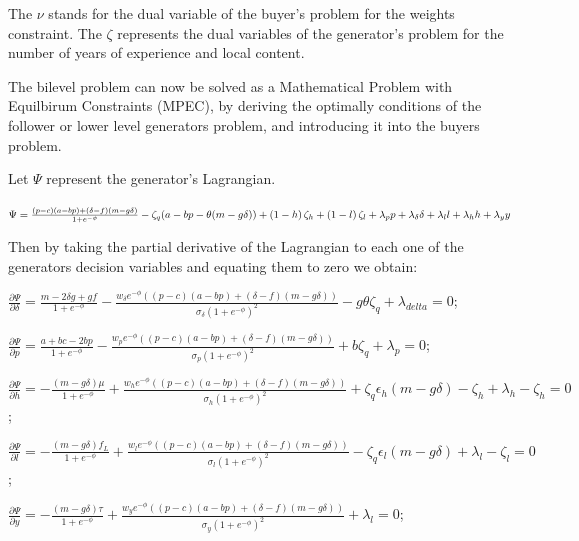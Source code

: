 \documentclass[informs]{informs3}
\begin{document}
The $\nu$ stands for the dual variable of the buyer's problem for the weights constraint. The $\zeta$ represents the dual variables of the generator's problem for the number of years of experience and local content. 

The bilevel problem can now be solved as a Mathematical Problem with  Equilbirum Constraints (MPEC), by deriving the optimally conditions of the follower or lower level generators problem, and introducing it into the buyers problem.

Let $\Psi$ represent the generator's Lagrangian.  

$\Psi =\frac{\left(p-c\right)(a - bp )+\left(\delta-f\right)(m -g\delta)}{1+e^{-\phi}} - \zeta_q(a - bp -\theta (m -g\delta))+\left( 1-h\right)\zeta_h+\left( 1-l\right)\zeta_l \\ +\lambda_p p+\lambda_{\delta} \delta+\lambda_l l +\lambda_h h+\lambda_y y  $

Then by taking the partial derivative of the Lagrangian to each one of the generators decision variables and equating them to zero we obtain:

$\frac{\partial \Psi}{\partial \delta} = \frac{m-2\delta g + g f}{1+e^{-\phi}}-\frac{w_{\delta} e^{-\phi} \left(\left(p-c\right)(a - bp )  +\left(\delta-f\right)(m -g\delta)\right)}{\sigma_{\delta}(1+e^{-\phi})^{2}}-g \theta \zeta_q + \lambda_{delta} =0 $;

$\frac{\partial \Psi}{\partial p} = \frac{a+bc-2bp}{1+e^{-\phi}}-\frac{w_p e^{-\phi} \left(\left(p-c\right)(a - bp )  +\left(\delta-f\right)(m -g\delta)\right)}{\sigma_{p}(1+e^{-\phi})^{2}}+b \zeta_q + \lambda_{p}  =0 $;

$\frac{\partial \Psi}{\partial h} = -\frac{\left(m-g\delta\right)\mu}{1+e^{-\phi}}+{\frac{w_h e^{-\phi} \left(\left(p-c\right)(a - bp )  +\left(\delta-f\right)(m -g\delta)\right)}{\sigma_{h}(1+e^{-\phi})^{2}}}+\zeta_q \epsilon_h \left( m-g\delta\right)-\zeta_h+ \lambda_{h}-\zeta_h  =0 $;

$\frac{\partial \Psi}{\partial l} =  -\frac{\left(m-g\delta\right)f_{L}}{1+e^{-\phi}}+{\frac{w_l e^{-\phi} \left(\left(p-c\right)(a - bp )  +\left(\delta-f\right)(m -g\delta)\right)}{\sigma_{l}(1+e^{-\phi})^{2}}}-\zeta_q \epsilon_l \left( m-g\delta\right)+ \lambda_{l}  -\zeta_l=0 $;

$\frac{\partial \Psi}{\partial y} = -\frac{\left(m-g\delta\right)\tau}{1+e^{-\phi}}+ {\frac{w_y e^{-\phi} \left(\left(p-c\right)(a - bp )  +\left(\delta-f\right)(m -g\delta)\right)}{\sigma_{y}(1+e^{-\phi})^{2}}}+\lambda_{l}  =0 $;
\end{document}
